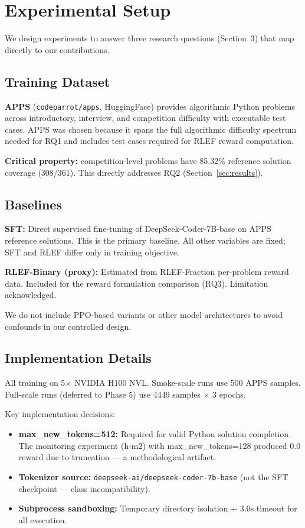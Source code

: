 \section{Experimental Setup}
\label{sec:experiments}

We design experiments to answer three research questions (Section~3) that map directly to our contributions.

\subsection{Training Dataset}

\textbf{APPS} \cite{Hendrycks2021APPS} (\texttt{codeparrot/apps}, HuggingFace) provides algorithmic Python problems across introductory, interview, and competition difficulty with executable test cases. APPS was chosen because it spans the full algorithmic difficulty spectrum needed for RQ1 and includes test cases required for RLEF reward computation.

\textbf{Critical property:} competition-level problems have 85.32\% reference solution coverage (308/361). This directly addresses RQ2 (Section~\ref{sec:results}).

\subsection{Baselines}

\textbf{SFT:} Direct supervised fine-tuning of DeepSeek-Coder-7B-base on APPS reference solutions. This is the primary baseline. All other variables are fixed; SFT and RLEF differ only in training objective.

\textbf{RLEF-Binary (proxy):} Estimated from RLEF-Fraction per-problem reward data. Included for the reward formulation comparison (RQ3). Limitation acknowledged.

We do not include PPO-based variants or other model architectures to avoid confounds in our controlled design.

\subsection{Implementation Details}

All training on 5$\times$ NVIDIA H100 NVL. Smoke-scale runs use 500 APPS samples. Full-scale runs (deferred to Phase 5) use 4449 samples $\times$ 3 epochs.

Key implementation decisions:
\begin{itemize}
  \item \textbf{max\_new\_tokens=512:} Required for valid Python solution completion. The monitoring experiment (h-m2) with max\_new\_tokens=128 produced 0.0 reward due to truncation --- a methodological artifact.
  \item \textbf{Tokenizer source:} \texttt{deepseek-ai/deepseek-coder-7b-base} (not the SFT checkpoint --- class incompatibility).
  \item \textbf{Subprocess sandboxing:} Temporary directory isolation + 3.0s timeout for all execution.
\end{itemize}

